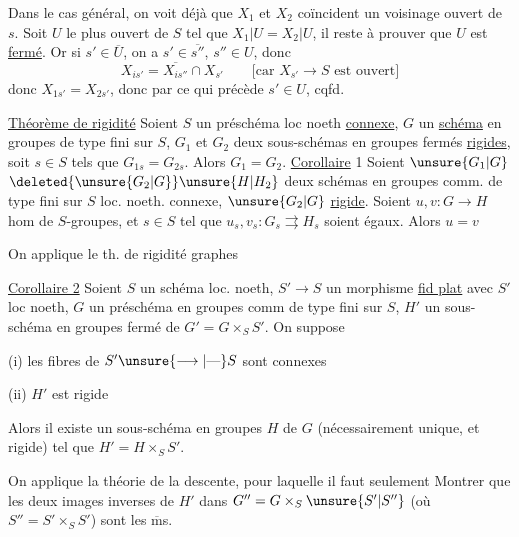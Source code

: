 Dans le cas général, on voit déjà que $X_1$ et $X_2$ coïncident  un voisinage ouvert  de $s$. Soit $U$ le plus  ouvert de $S$ tel que $X_1|U=X_2|U$, il reste à prouver que $U$ est \uline{fermé}. Or si $s'\in\overline U$, on a $s'\in\overline{s''}$, $s''\in U$, donc
\[
X_{is'}=\overline{X_{is''}}\cap X_{s'}\qquad
\text{[car $X_{s'}\to S$ est ouvert]}
\]
donc $X_{1s'}=X_{2s'}$, donc par ce qui précède $s'\in U$, cqfd.

\uline{Théorème de rigidité} Soient $S$ un préschéma loc noeth \uline{connexe}, $G$ un \uline{schéma} en groupes  de type fini  sur $S$, $G_1$ et $G_2$ deux sous-schémas en groupes fermés \uline{rigides}, soit $s\in S$ tels que $G_{1s}=G_{2s}$.   Alors $G_1=G_2$.
\uline{Corollaire} 1 Soient $\unsure{G_1|G}$ $\deleted{\unsure{G_2|G}}\unsure{H|H_2}$ deux  schémas en groupes comm. de type fini sur $S$ loc. noeth. connexe, $\unsure{G_2|G}$ \uline{rigide}. Soient $u,v:G\longrightarrow H$  hom de $S$-groupes, et $s\in S$ tel que $u_s,v_s:G_s\rightrightarrows H_s$ soient égaux. Alors $u=v$

On applique le th. de rigidité  graphes

\uline{Corollaire 2} Soient $S$ un schéma loc. noeth, $S'\longrightarrow S$ un morphisme \uline{fid plat}  avec $S'$ loc noeth, $G$ un préschéma en groupes comm de type fini sur $S$, $H'$ un sous-schéma en groupes fermé de $G'=G\times_S S'$. On suppose

(i) les fibres de $S'\unsure{\longrightarrow|\text{---}}S$ sont  connexes

(ii) $H'$ est rigide

Alors il existe un sous-schéma en groupes  $H$ de $G$ (nécessairement unique, et rigide) tel que $H'=H\times_S S'$.

On applique la théorie de la descente, pour laquelle il faut seulement
Montrer que les deux images inverses de $H'$ dans $G''=G\times_S\unsure{S'|S''}$ (où $S''=S'\times_S S'$) sont les $\overline{\mathrm{m}}$s.


